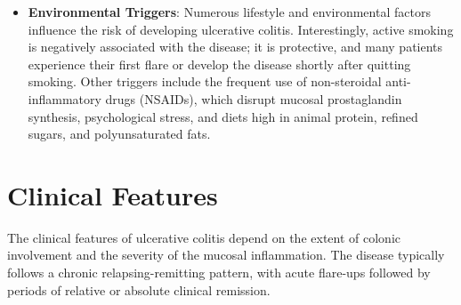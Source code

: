 \begin{itemize}
  \item \textbf{Environmental Triggers}: Numerous lifestyle and environmental factors influence the risk of developing ulcerative colitis. Interestingly, active smoking is negatively associated with the disease; it is protective, and many patients experience their first flare or develop the disease shortly after quitting smoking. Other triggers include the frequent use of non-steroidal anti-inflammatory drugs (NSAIDs), which disrupt mucosal prostaglandin synthesis, psychological stress, and diets high in animal protein, refined sugars, and polyunsaturated fats.
\end{itemize}

\section*{Clinical Features}
The clinical features of ulcerative colitis depend on the extent of colonic involvement and the severity of the mucosal inflammation. The disease typically follows a chronic relapsing-remitting pattern, with acute flare-ups followed by periods of relative or absolute clinical remission.

